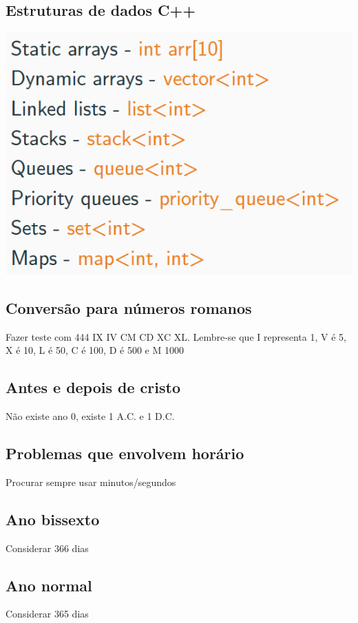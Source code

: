 \documentclass[a4paper,12pt]{article}
\begin{document}
\subsection{Estruturas de dados C++}
\begin{center}
  \includegraphics[width=\linewidth/2]{figures/outros/eds_c++.png}
\end{center}

\subsection{Conversão para números romanos}
\noindent Fazer teste com 444 IX IV CM CD XC XL. Lembre-se que I representa 1, V é 5, X é 10, L é 50, C é 100, D é 500 e M 1000

\subsection{Antes e depois de cristo}
\noindent Não existe ano 0, existe 1 A.C. e 1 D.C.

\subsection{Problemas que envolvem horário}
\noindent Procurar sempre usar minutos/segundos

\subsection{Ano bissexto}
\noindent Considerar 366 dias

\subsection{Ano normal}
\noindent Considerar 365 dias
\end{document}
